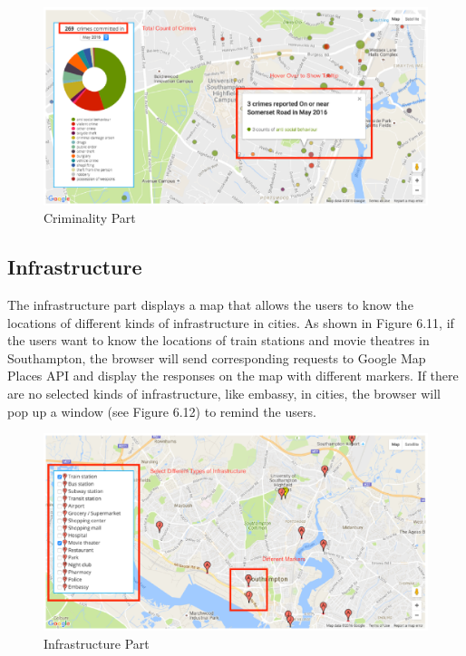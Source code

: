 \begin{figure}[H]
  \centering
  \includegraphics[width=15cm]{./img/Picture26}
  \caption{Criminality Part
}
  \label{Figure:figex}
\end{figure}


\subsection{Infrastructure}

The infrastructure part displays a map that allows the users to know the locations of different kinds of infrastructure in cities. As shown in Figure 6.11, if the users want to know the locations of train stations and movie theatres in Southampton, the browser will send corresponding requests to Google Map Places API and display the responses on the map with different markers. If there are no selected kinds of infrastructure, like embassy, in cities, the browser will pop up a window (see Figure 6.12) to remind the users.


\begin{figure}[H]
  \centering
  \includegraphics[width=15cm]{./img/Picture27}
  \caption{Infrastructure Part}
  \label{Figure:figex}
\end{figure}

